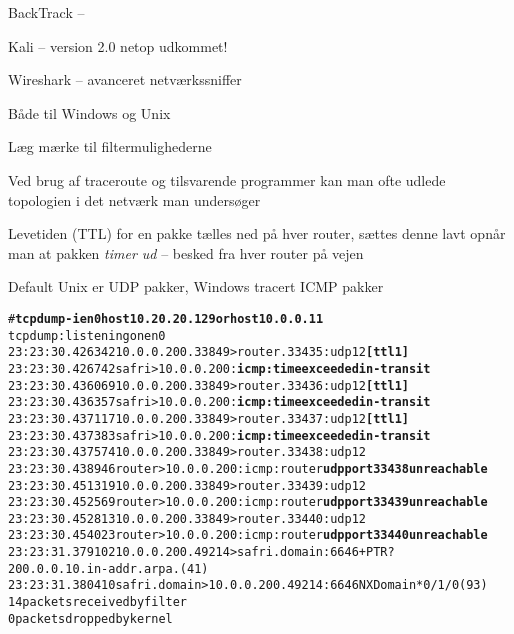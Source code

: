 \documentclass[20pt,landscape,a4paper,footrule]{foils}
\begin{document}

\begin{list1}
\item BackTrack -- 
\item Kali --  version 2.0 netop udkommet!
\item Wireshark --  avanceret netværkssniffer
\end{list1}




\centerline{}
\centerline{Både til Windows og Unix}




\centerline{Læg mærke til filtermulighederne}



\begin{list1}
\item Ved brug af traceroute og tilsvarende programmer kan man ofte
  udlede topologien i det netværk man undersøger
\item Levetiden (TTL) for en pakke tælles ned på hver router, sættes denne lavt
  opnår man at pakken \emph{timer ud} -- besked fra hver router på vejen
\item Default Unix er UDP pakker, Windows tracert ICMP pakker
\end{list1}



\begin{alltt}
\footnotesize # {\bfseries tcpdump -i en0 host 10.20.20.129 or host 10.0.0.11}
tcpdump: listening on en0
23:23:30.426342 10.0.0.200.33849 > router.33435: udp 12 {\bf [ttl 1]}
23:23:30.426742 safri > 10.0.0.200: {\bf icmp: time exceeded in-transit}
23:23:30.436069 10.0.0.200.33849 > router.33436: udp 12 {\bf [ttl 1]}
23:23:30.436357 safri > 10.0.0.200: {\bf icmp: time exceeded in-transit}
23:23:30.437117 10.0.0.200.33849 > router.33437: udp 12 {\bf [ttl 1]}
23:23:30.437383 safri > 10.0.0.200: {\bf icmp: time exceeded in-transit}
23:23:30.437574 10.0.0.200.33849 > router.33438: udp 12
23:23:30.438946 router > 10.0.0.200: icmp: router {\bf udp port 33438 unreachable}
23:23:30.451319 10.0.0.200.33849 > router.33439: udp 12
23:23:30.452569 router > 10.0.0.200: icmp: router {\bf udp port 33439 unreachable}
23:23:30.452813 10.0.0.200.33849 > router.33440: udp 12
23:23:30.454023 router > 10.0.0.200: icmp: router {\bf udp port 33440 unreachable}
23:23:31.379102 10.0.0.200.49214 > safri.domain:  6646+ PTR?
200.0.0.10.in-addr.arpa. (41)
23:23:31.380410 safri.domain > 10.0.0.200.49214:  6646 NXDomain* 0/1/0 (93)
14 packets received by filter
0 packets dropped by kernel
\end{alltt}
\end{document}
